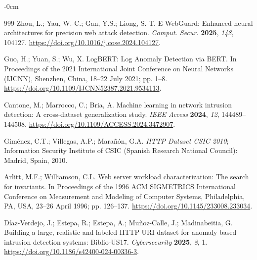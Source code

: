 \documentclass[futureinternet,article,submit,moreauthors]{Definitions/mdpi}
\begin{document}
\begin{adjustwidth}{-\extralength}{0cm}
\begin{thebibliography}{999}
Zhou, L.; Yau, W.-C.; Gan, Y.S.; Liong, S.-T. E-WebGuard: Enhanced neural architectures for precision web attack detection. \emph{Comput. Secur.} \textbf{2025}, \emph{148}, 104127. \url{https://doi.org/10.1016/j.cose.2024.104127}.

Guo, H.; Yuan, S.; Wu, X. LogBERT: Log Anomaly Detection via BERT. In Proceedings of the 2021 International Joint Conference on Neural Networks (IJCNN), Shenzhen, China, 18--22 July 2021; pp. 1--8. \url{https://doi.org/10.1109/IJCNN52387.2021.9534113}.

Cantone, M.; Marrocco, C.; Bria, A. Machine learning in network intrusion detection: A cross-dataset generalization study. \emph{IEEE Access} \textbf{2024}, \emph{12}, 144489--144508. \url{https://doi.org/10.1109/ACCESS.2024.3472907}.

Gim\'{e}nez, C.T.; Villegas, A.P.; Mara\~{n}\'{o}n, G.A. \emph{HTTP Dataset CSIC 2010}; Information Security Institute of CSIC (Spanish Research National Council): Madrid, Spain, 2010.

Arlitt, M.F.; Williamson, C.L. Web server workload characterization: The search for invariants. In Proceedings of the 1996 ACM SIGMETRICS International Conference on Measurement and Modeling of Computer Systems, Philadelphia, PA, USA, 23--26 April 1996; pp. 126--137. \url{https://doi.org/10.1145/233008.233034}.

D\'{i}az-Verdejo, J.; Estepa, R.; Estepa, A.; Mu\~{n}oz-Calle, J.; Madinabeitia, G. Building a large, realistic and labeled HTTP URI dataset for anomaly-based intrusion detection systems: Biblio-US17. \emph{Cybersecurity} \textbf{2025}, \emph{8}, 1. \url{https://doi.org/10.1186/s42400-024-00336-3}.

\end{thebibliography}
\end{adjustwidth}
\end{document}
